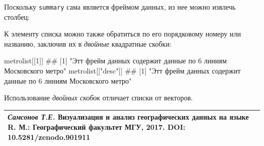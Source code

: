 \documentclass[]{book}
\newenvironment{Shaded}{\begin{snugshade}}{\end{snugshade}}
\newcommand{\DecValTok}[1]{\textcolor[rgb]{0.00,0.00,0.81}{#1}}
\newcommand{\StringTok}[1]{\textcolor[rgb]{0.31,0.60,0.02}{#1}}
\newcommand{\OperatorTok}[1]{\textcolor[rgb]{0.81,0.36,0.00}{\textbf{#1}}}
\newcommand{\NormalTok}[1]{#1}
\begin{document}
Поскольку \texttt{summary} сама является фреймом данных, из нее можно
извлечь столбец:

\begin{Shaded}
\end{Shaded}

К элементу списка можно также обратиться по его порядковому номеру или
названию, заключив их в \emph{двойные} квадратные скобки:

\begin{Shaded}
\begin{Highlighting}[]
\NormalTok{metrolist[[}\DecValTok{1}\NormalTok{]]}
\NormalTok{## [1] "Этт фрейм данных содержит данные по 6 линиям Московского метро"}
\NormalTok{metrolist[[}\StringTok{"desc"}\NormalTok{]]}
\NormalTok{## [1] "Этт фрейм данных содержит данные по 6 линиям Московского метро"}
\end{Highlighting}
\end{Shaded}

Использование \emph{двойных скобок} отличает списки от векторов.

\begin{longtable}[]{@{}l@{}}
\toprule
\emph{Самсонов Т.Е.} \textbf{Визуализация и анализ географических данных
на языке R.} М.: Географический факультет МГУ, 2017. DOI:
10.5281/zenodo.901911\tabularnewline
\bottomrule
\end{longtable}


\end{document}
